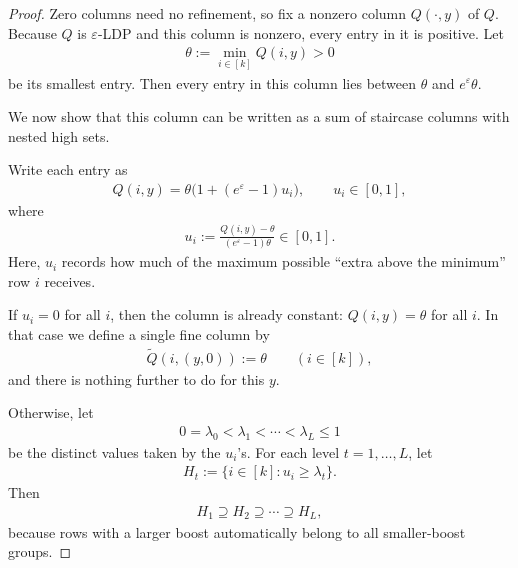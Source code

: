 \documentclass{article}
\theoremstyle{plain}
\theoremstyle{definition}
\theoremstyle{plain}
\begin{document}
\begin{proof}
Zero columns need no refinement, so fix a nonzero column $Q(\cdot,y)$ of $Q$.
Because $Q$ is $\varepsilon$-LDP and this column is nonzero, every entry in it is positive.
Let
\begin{align*}
    \theta:=\min_{i\in[k]} Q(i,y)>0
\end{align*}
be its smallest entry. Then every entry in this column lies between $\theta$ and $e^\varepsilon\theta$.

We now show that this column can be written as a sum of staircase columns with nested high sets.

Write each entry as
\begin{align*}
    Q(i,y)=\theta\bigl(1+(e^\varepsilon-1)u_i\bigr), \qquad u_i\in[0,1],
\end{align*}
where
\begin{align*}
    u_i:=\frac{Q(i,y)-\theta}{(e^\varepsilon-1)\theta}\in[0,1].
\end{align*}
Here, $u_i$ records how much of the maximum possible ``extra above the minimum'' row $i$ receives.

If $u_i=0$ for all $i$, then the column is already constant: $Q(i,y)=\theta$ for all $i$.
In that case we define a single fine column by
\begin{align*}
    \widetilde Q(i,(y,0)):=\theta \qquad (i\in[k]),
\end{align*}
and there is nothing further to do for this $y$.

Otherwise, let
\begin{align*}
    0=\lambda_0<\lambda_1<\cdots<\lambda_L\le 1
\end{align*}
be the distinct values taken by the $u_i$'s. For each level $t=1,\dots,L$, let
\begin{align*}
    H_t:=\{i\in[k]:u_i\ge \lambda_t\}.
\end{align*}
Then
\begin{align*}
    H_1\supseteq H_2\supseteq \cdots \supseteq H_L,
\end{align*}
because rows with a larger boost automatically belong to all smaller-boost groups.


\end{proof}
\end{document}
